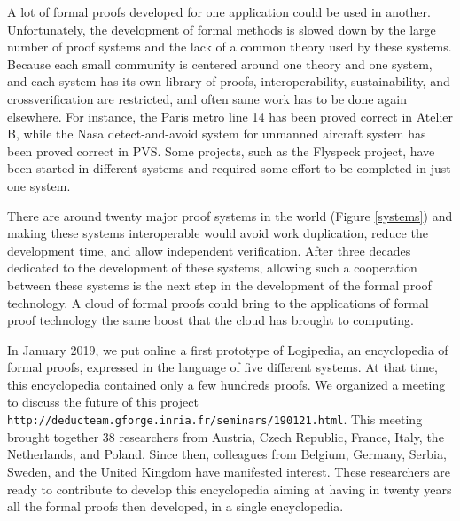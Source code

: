 A lot of formal proofs developed for one application could be used in
another.  Unfortunately, the development of formal methods is slowed
down by the large number of proof systems and the lack of a common
theory used by these systems.  Because each small community is
centered around one theory and one system, and each system has its own
library of proofs, interoperability, sustainability, and
crossverification are restricted, and often same work has to be done
again elsewhere.  For instance, the Paris metro line 14 has been proved
correct in {\sc Atelier B}, while the Nasa detect-and-avoid system for
unmanned aircraft system has been proved correct in {\sc PVS}. Some
projects, such as the Flyspeck project, have been started in different
systems and required some effort to be completed in just one system.

There are around twenty major proof systems in the world (Figure
\ref{systems}) and making these systems interoperable would avoid work
duplication, reduce the development time, and allow independent
verification.  After three decades dedicated to the development of
these systems, allowing such a cooperation between these systems is
the next step in the development of the formal proof technology.  A
cloud of formal proofs could bring to the applications of formal proof
technology the same boost that the cloud has brought to computing.

In January 2019, we put online a first prototype of {\sc Logipedia},
an encyclopedia of formal proofs, expressed in the language of five
different systems. At that time, this encyclopedia contained only a
few hundreds proofs. We organized a meeting to discuss the future
of this project {\tt
  http://deducteam.gforge.inria.fr/seminars/190121.html}.  This
meeting brought together 38 researchers from Austria, Czech Republic,
France, Italy, the Netherlands, and Poland. Since then, colleagues
from Belgium, Germany, Serbia, Sweden, and the United Kingdom have
manifested interest. These researchers are ready to contribute to
develop this encyclopedia aiming at having in twenty years all the
formal proofs then developed, in a single encyclopedia.

